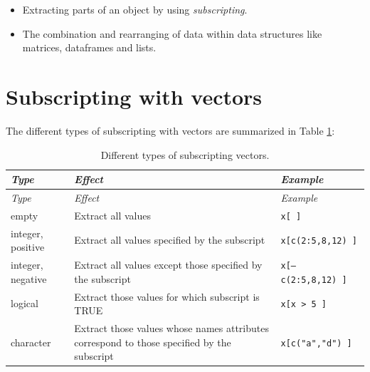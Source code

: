 \documentclass[
]{book}
\providecommand{\tightlist}{%
  \setlength{\itemsep}{0pt}\setlength{\parskip}{0pt}}
\begin{document}
\begin{itemize}
\tightlist
\item
  Extracting parts of an object by using \emph{{subscripting}}.
\item
  The combination and rearranging of data within data structures like matrices, dataframes and lists.
\end{itemize}

\section{Subscripting with vectors}\label{vectorSubscripting}

The different types of subscripting with vectors are summarized in Table \ref{tab:SubscriptVectorTypes}:

\begin{longtable}[]{@{}
  >{\raggedright\arraybackslash}p{}
  >{\raggedright\arraybackslash}p{}
  >{\raggedright\arraybackslash}p{}@{}}
\caption{\label{tab:SubscriptVectorTypes} Different types of subscripting vectors.}\tabularnewline
\toprule\noalign{}
\begin{minipage}[b]{\linewidth}\raggedright
\emph{{Type}}
\end{minipage} & \begin{minipage}[b]{\linewidth}\raggedright
\emph{{Effect}}
\end{minipage} & \begin{minipage}[b]{\linewidth}\raggedright
\emph{{Example}}
\end{minipage} \\
\midrule\noalign{}
\endfirsthead
\toprule\noalign{}
\begin{minipage}[b]{\linewidth}\raggedright
\emph{{Type}}
\end{minipage} & \begin{minipage}[b]{\linewidth}\raggedright
\emph{{Effect}}
\end{minipage} & \begin{minipage}[b]{\linewidth}\raggedright
\emph{{Example}}
\end{minipage} \\
\midrule\noalign{}
\endhead
\bottomrule\noalign{}
\endlastfoot
empty & Extract all values & \texttt{x{[}\ {]}} \\
integer, positive & Extract all values specified by the subscript & \texttt{x{[}c(2:5,8,12)\ {]}} \\
integer, negative & Extract all values except those specified by the subscript & \texttt{x{[}–c(2:5,8,12)\ {]}} \\
logical & Extract those values for which subscript is TRUE & \texttt{x{[}x\ \textgreater{}\ 5\ {]}} \\
character & Extract those values whose names attributes correspond to those specified by the subscript & \texttt{x{[}c("a","d")\ {]}} \\
\end{longtable}
\end{document}
